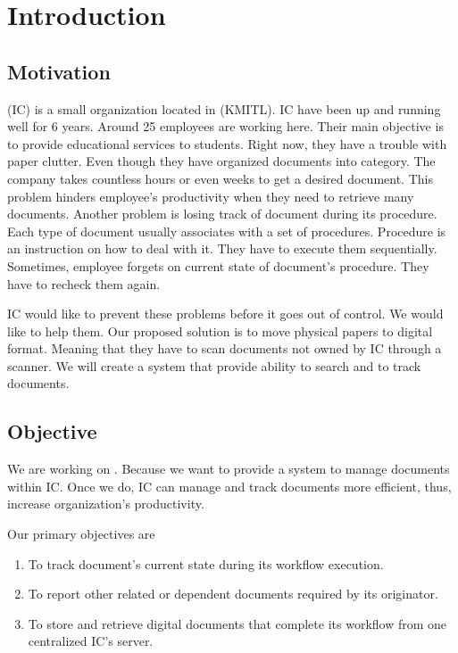 \chapter{Introduction}

\section{Motivation}
\IC (IC) is a small organization located in \kmitl (KMITL). 
IC have been up and running well for 6 years. 
Around 25 employees are working here. 
Their main objective is to provide educational services to students. 
Right now, they have a trouble with paper clutter. 
Even though they have organized documents into category. 
The company takes countless hours or even weeks to get a desired document. 
This problem hinders employee's productivity when they need to retrieve many documents. 
Another problem is losing track of document during its procedure. 
Each type of document usually associates with a set of procedures. 
Procedure is an instruction on how to deal with it. 
They have to execute them sequentially. 
Sometimes, employee forgets on current state of document's procedure. 
They have to recheck them again.

IC would like to prevent these problems before it goes out of control. 
We would like to help them. 
Our proposed solution is to move physical papers to digital format. 
Meaning that they have to scan documents not owned by IC through a scanner. 
We will create a system that provide ability to search and to track documents.

\section{Objective}
We are working on \dms.
Because we want to provide a system to manage documents within IC.
Once we do, IC can manage and track documents more efficient, thus, increase organization's productivity.

Our primary objectives are
\begin{enumerate}
\item To track document's current state during its workflow execution.
\item To report other related or dependent documents required by its originator.
\item To store and retrieve digital documents that complete its workflow from one centralized IC's server.
\end{enumerate}

